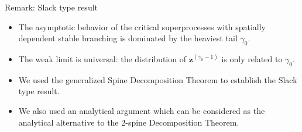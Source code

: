 \documentclass[xcolor=dvipsnames]{beamer}
\begin{document}
\begin{frame}{Remark: Slack type result}
\begin{itemize}
\item
{\color{red} The asymptotic behavior} of the critical superprocesses with spatially dependent stable branching {\color{red} is dominated by the heaviest tail $\gamma_0$}.
\item
The weak limit is {\color{red} universal}: the distribution of $\mathbf z^{(\gamma_0 - 1)}$ is only related to $\gamma_0$.
\item
We used the {\color{red} generalized Spine Decomposition Theorem} to establish the Slack type result.
\item
We also used an {\color{red} analytical argument} which can be considered as the {\color{red} analytical alternative} to the {\color{red} 2-spine Decomposition Theorem}.
\end{itemize}
\end{frame}
\end{document}
